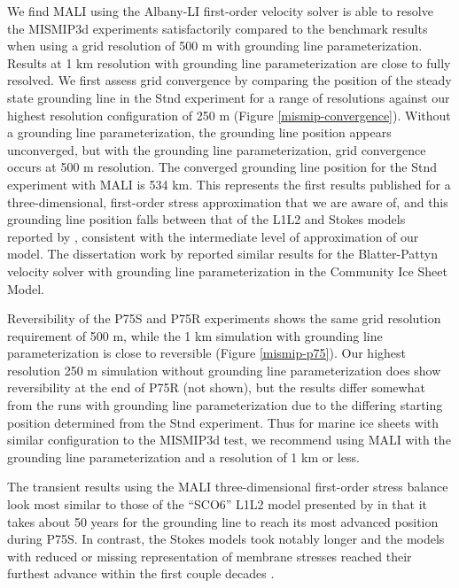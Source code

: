 We find MALI using the Albany-LI first-order velocity solver is able to resolve the MISMIP3d experiments
satisfactorily compared to the \citet{pattyn2013} benchmark results
when using a grid resolution of 500 m with grounding line parameterization.  
Results at 1 km resolution with grounding line parameterization are close to fully resolved.
We first assess grid convergence by comparing the position of the steady state grounding line in the Stnd experiment
for a range of resolutions against our highest resolution configuration of 250 m (Figure \ref{mismip-convergence}).
Without a grounding line parameterization, the grounding line position appears unconverged,
but with the grounding line parameterization, grid convergence occurs at 500 m resolution.
The converged grounding line position for the Stnd experiment with MALI is 534 km.
This represents the first results published for a three-dimensional, first-order stress approximation
that we are aware of, and this grounding line position falls between that of the L1L2 and Stokes models reported
by \citet{pattyn2013}, consistent with the intermediate level of approximation of our model.
The dissertation work by \citet{Leguy2015a} reported similar results for the Blatter-Pattyn velocity solver with grounding line parameterization in the Community Ice Sheet Model.

Reversibility of the P75S and P75R experiments shows the same grid resolution requirement 
of 500 m,
while the 1 km simulation with grounding line parameterization is close to reversible
(Figure \ref{mismip-p75}).
Our highest resolution 250 m simulation without grounding line parameterization
does show reversibility at the end of P75R (not shown), but the results differ somewhat
from the runs with grounding line parameterization due to the differing starting position
determined from the Stnd experiment.
Thus for marine ice sheets with similar configuration to the MISMIP3d test,
we recommend using MALI with the grounding line parameterization and a resolution of 1 km or less.

The transient results using the MALI three-dimensional first-order stress balance
look most similar to those of the ``SCO6'' L1L2 model presented by \citet{pattyn2013}
in that it takes about 50 years for the grounding line to reach its most advanced position
during P75S.
In contrast, the Stokes models took notably longer and the models with reduced or missing representation of membrane stresses reached their furthest advance within the first couple decades \citep{pattyn2013}.

